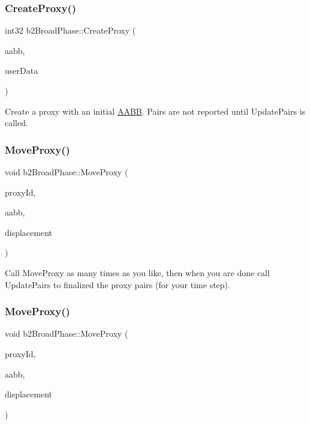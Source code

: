 \subsubsection{\texorpdfstring{Create\+Proxy()}{CreateProxy()}\hspace{0.1cm}{\footnotesize\ttfamily [2/2]}}
{\footnotesize\ttfamily int32 b2\+Broad\+Phase\+::\+Create\+Proxy (\begin{DoxyParamCaption}\item[{const \hyperlink{structb2AABB}{b2\+A\+A\+BB} \&}]{aabb,  }\item[{void $\ast$}]{user\+Data }\end{DoxyParamCaption})}

Create a proxy with an initial \hyperlink{classAABB}{A\+A\+BB}. Pairs are not reported until Update\+Pairs is called. \mbox{\label{classb2BroadPhase_a01dc18a19c2b5d0cc1d9cd8c8554234c}} 
\subsubsection{\texorpdfstring{Move\+Proxy()}{MoveProxy()}\hspace{0.1cm}{\footnotesize\ttfamily [1/2]}}
{\footnotesize\ttfamily void b2\+Broad\+Phase\+::\+Move\+Proxy (\begin{DoxyParamCaption}\item[{int32}]{proxy\+Id,  }\item[{const \hyperlink{structb2AABB}{b2\+A\+A\+BB} \&}]{aabb,  }\item[{const \hyperlink{structb2Vec2}{b2\+Vec2} \&}]{displacement }\end{DoxyParamCaption})}

Call Move\+Proxy as many times as you like, then when you are done call Update\+Pairs to finalized the proxy pairs (for your time step). \mbox{\label{classb2BroadPhase_a01dc18a19c2b5d0cc1d9cd8c8554234c}} 
\subsubsection{\texorpdfstring{Move\+Proxy()}{MoveProxy()}\hspace{0.1cm}{\footnotesize\ttfamily [2/2]}}
{\footnotesize\ttfamily void b2\+Broad\+Phase\+::\+Move\+Proxy (\begin{DoxyParamCaption}\item[{int32}]{proxy\+Id,  }\item[{const \hyperlink{structb2AABB}{b2\+A\+A\+BB} \&}]{aabb,  }\item[{const \hyperlink{structb2Vec2}{b2\+Vec2} \&}]{displacement }\end{DoxyParamCaption})}

